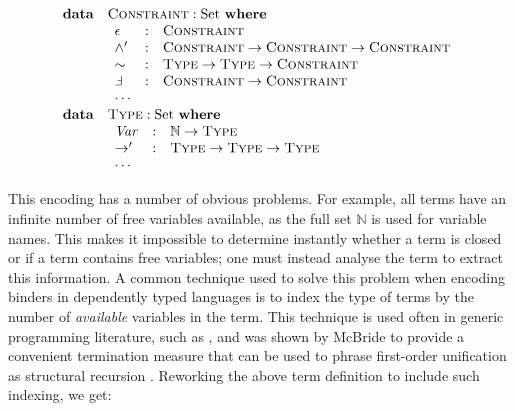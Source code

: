 \documentclass[a4paper]{jfp}
\begin{document}
\nopagebreak

\begin{displaymath}   
	\begin{array}{ll}
		\textbf{data} & \textsc{Constraint} : \text{Set}\ \textbf{where} \\
		              & \begin{array}{lcl}
                         \epsilon & : & \textsc{Constraint} \\
						 \land'   & : & \textsc{Constraint} \rightarrow \textsc{Constraint} \rightarrow \textsc{Constraint} \\
						 \sim     & : & \textsc{Type} \rightarrow \textsc{Type} \rightarrow \textsc{Constraint} \\
						 \Finv    & : & \textsc{Constraint} \rightarrow \textsc{Constraint} \\
						 \cdots \\
					    \end{array} \\
		\textbf{data} & \textsc{Type} : \text{Set}\ \textbf{where} \\
		              & \begin{array}{lcl}
                         \mathit{Var} & : & \mathbb{N} \rightarrow \textsc{Type} \\
						 \rightarrow' & : & \textsc{Type} \rightarrow \textsc{Type} \rightarrow \textsc{Type} \\
						 \cdots \\
					    \end{array} \\						
     \end{array}
\end{displaymath}	 

This encoding has a number of obvious problems. For example, all terms have an infinite number of free variables available, as the full set $\mathbb{N}$ is used for variable names. This makes it impossible to determine instantly whether a term is closed or if a term contains free variables; one must instead analyse the term to extract this information. A common technique used to solve this problem when encoding binders in dependently typed languages is to index the type of terms by the number of \emph{available} variables in the term. This technique is used often in generic programming literature, such as \cite{Morris04exploringthe}, and was shown by McBride to provide a convenient termination measure that can be used to phrase first-order unification as structural recursion \cite{McBride:2003bg}. Reworking the above term definition to include such indexing, we get:
\end{document}
